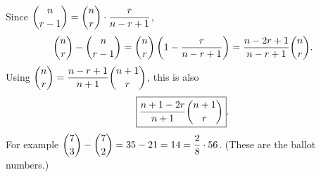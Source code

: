 Since $\dbinom n{r-1}=\dbinom nr\cdot\dfrac{r}{n-r+1}$,
\[\dbinom nr-\dbinom n{r-1}=\dbinom nr\left(1-\dfrac{r}{n-r+1}\right)=\dfrac{n-2r+1}{n-r+1}\dbinom nr.\]
Using $\dbinom nr=\dfrac{n-r+1}{n+1}\dbinom{n+1}r$, this is also
\[\boxed{\dfrac{n+1-2r}{n+1}\dbinom{n+1}{r}}.\]
For example $\dbinom73-\dbinom72=35-21=14=\dfrac{2}{8}\cdot56$. (These are the ballot numbers.)
